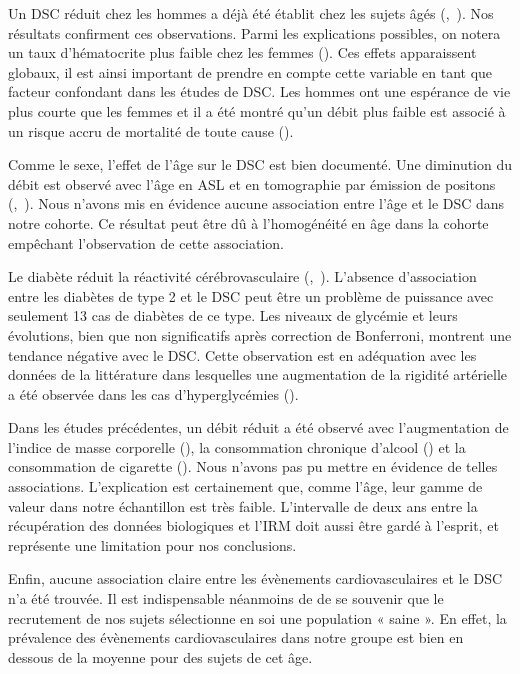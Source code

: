 Un DSC réduit chez les hommes a déjà été établit chez les sujets âgés (\cite{Liu2012},~\cite{Chen2011}). Nos résultats
confirment ces observations. Parmi les explications possibles, on notera un taux d’hématocrite plus
faible chez les femmes (\cite{Liu2012}). Ces effets apparaissent globaux, il est ainsi important de prendre en
compte cette variable en tant que facteur confondant dans les études de DSC. Les hommes ont une
espérance de vie plus courte que les femmes et il a été montré qu’un débit plus faible est associé à un
risque accru de mortalité de toute cause (\cite{Sabayan2013}).

Comme le sexe, l’effet de l’âge sur le DSC est bien documenté. Une diminution du débit est
observé avec l’âge en ASL et en tomographie par émission de positons (\cite{Chen2011},~\cite{Martin1991}). Nous n’avons mis
en évidence aucune association entre l’âge et le DSC dans notre cohorte. Ce résultat peut être dû à
l’homogénéité en âge dans la cohorte empêchant l’observation de cette association.

Le diabète réduit la réactivité cérébrovasculaire (\cite{Dandona1978},~\cite{Fulesdi1997}). L’absence d’association entre les
diabètes de type 2 et le DSC peut être un problème de puissance avec seulement 13 cas de diabètes
de ce type. Les niveaux de glycémie et leurs évolutions, bien que non significatifs après correction de
Bonferroni, montrent une tendance négative avec le DSC. Cette observation est en adéquation avec
les données de la littérature dans lesquelles une augmentation de la rigidité artérielle a été observée
dans les cas d’hyperglycémies (\cite{Rubin2012}).

Dans les études précédentes, un débit réduit a été observé avec l’augmentation de l’indice de
masse corporelle (\cite{Willeumier2011}), la consommation chronique d’alcool (\cite{Schmidt2012}) et la consommation de cigarette
(\cite{Kubota1983}). Nous n’avons pas pu mettre en évidence de telles associations. L’explication est certainement
que, comme l’âge, leur gamme de valeur dans notre échantillon est très faible. L’intervalle de deux ans
entre la récupération des données biologiques et l’IRM doit aussi être gardé à l’esprit, et représente
une limitation pour nos conclusions.

Enfin, aucune association claire entre les évènements cardiovasculaires et le DSC n’a été
trouvée. Il est indispensable néanmoins de de se souvenir que le recrutement de nos sujets sélectionne
en soi une population « saine ». En effet, la prévalence des évènements cardiovasculaires dans notre
groupe est bien en dessous de la moyenne pour des sujets de cet âge.

